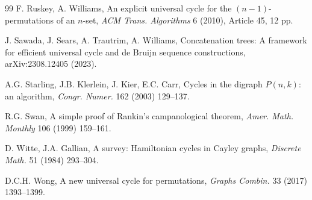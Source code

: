 \documentclass[4pt]{article} %
\begin{document}
\begin{thebibliography}{99}
F. Ruskey, A. Williams,
An explicit universal cycle for the $(n-1)$-permutations of an $n$-set,
\emph{ACM Trans. Algorithms} 6 (2010), Article 45, 12 pp.

J. Sawada, J. Sears, A. Trautrim, A. Williams,
Concatenation trees: A framework for efficient universal cycle and de Bruijn
sequence constructions,
arXiv:2308.12405 (2023).

A.G. Starling, J.B. Klerlein, J. Kier, E.C. Carr,
Cycles in the digraph $P(n,k)$: an algorithm,
\emph{Congr. Numer.} 162 (2003) 129--137.

R.G. Swan,
A simple proof of Rankin's campanological theorem,
\emph{Amer. Math. Monthly} 106 (1999) 159--161.

D. Witte, J.A. Gallian,
A survey: Hamiltonian cycles in Cayley graphs,
\emph{Discrete Math.} 51 (1984) 293--304.

D.C.H. Wong,
A new universal cycle for permutations,
\emph{Graphs Combin.} 33 (2017) 1393--1399.

\end{thebibliography}
\end{document}
